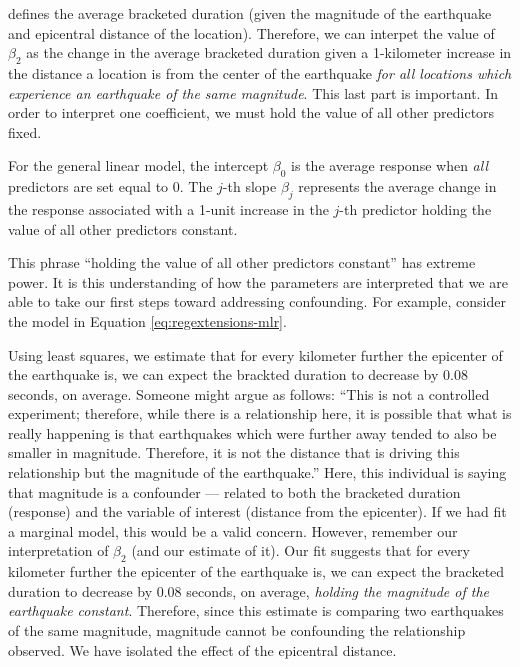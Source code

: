 \documentclass[]{book}
\theoremstyle{plain}
\theoremstyle{mydefn}
\theoremstyle{myexmpl}
\theoremstyle{remark}
\let\BeginKnitrBlock\begin \let\EndKnitrBlock\end
\let\BeginKnitrBlock\begin \let\EndKnitrBlock\end
\begin{document}
defines the average bracketed duration (given the magnitude of the
earthquake and epicentral distance of the location). Therefore, we can
interpet the value of \(\beta_2\) as the change in the average bracketed
duration given a 1-kilometer increase in the distance a location is from
the center of the earthquake \emph{for all locations which experience an
earthquake of the same magnitude}. This last part is important. In order
to interpret one coefficient, we must hold the value of all other
predictors fixed.

\BeginKnitrBlock{rmdtip}
For the general linear model, the intercept \(\beta_0\) is the average
response when \emph{all} predictors are set equal to 0. The \(j\)-th
slope \(\beta_j\) represents the average change in the response
associated with a 1-unit increase in the \(j\)-th predictor holding the
value of all other predictors constant.
\EndKnitrBlock{rmdtip}

This phrase ``holding the value of all other predictors constant'' has
extreme power. It is this understanding of how the parameters are
interpreted that we are able to take our first steps toward addressing
confounding. For example, consider the model in Equation
\eqref{eq:regextensions-mlr}.

Using least squares, we estimate that for every kilometer further the
epicenter of the earthquake is, we can expect the brackted duration to
decrease by 0.08 seconds, on average. Someone might argue as follows:
``This is not a controlled experiment; therefore, while there is a
relationship here, it is possible that what is really happening is that
earthquakes which were further away tended to also be smaller in
magnitude. Therefore, it is not the distance that is driving this
relationship but the magnitude of the earthquake.'' Here, this
individual is saying that magnitude is a confounder --- related to both
the bracketed duration (response) and the variable of interest (distance
from the epicenter). If we had fit a marginal model, this would be a
valid concern. However, remember our interpretation of \(\beta_2\) (and
our estimate of it). Our fit suggests that for every kilometer further
the epicenter of the earthquake is, we can expect the bracketed duration
to decrease by 0.08 seconds, on average, \emph{holding the magnitude of
the earthquake constant}. Therefore, since this estimate is comparing
two earthquakes of the same magnitude, magnitude cannot be confounding
the relationship observed. We have isolated the effect of the epicentral
distance.
\end{document}
